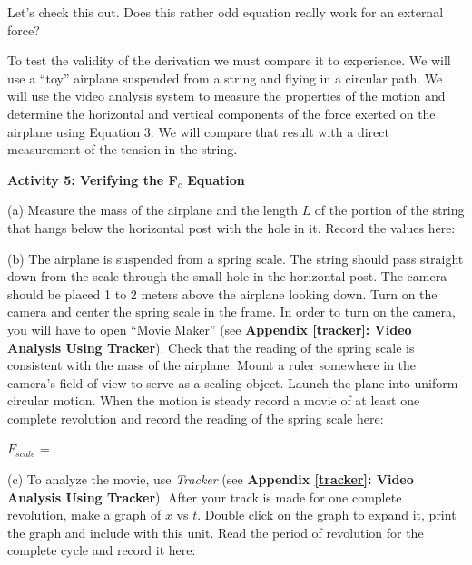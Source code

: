 Let's check this out. Does this rather odd equation really work for an external
force?

To test the validity of the derivation we must compare it to experience. We
will use a ``toy'' airplane suspended from a string and flying
in a circular path. We will use the video analysis system to measure the properties
of the motion and determine the horizontal and vertical components of the force
exerted on the airplane using Equation 3. We will compare that result with a
direct measurement of the tension in the string. 

\textbf{Activity 5: Verifying the F\( _{c} \) Equation }

(a) Measure the mass of the airplane and the length $L$ of the portion of the
string that hangs below the horizontal post with the hole in it. Record the
values here: 
\vspace{10mm}

(b) The airplane is suspended from a spring scale. The string should pass straight
down from the scale through the small hole in the horizontal post. The camera
should be placed 1 to 2 meters above the airplane looking down. Turn on the camera and center
the spring scale in the frame. In order to turn on the camera, you will have to open ``Movie Maker'' (see \textbf{Appendix \ref{tracker}: Video Analysis Using Tracker}). Check that the reading of the spring
scale is consistent with the mass of the airplane. Mount a ruler somewhere in the
camera's field of view to serve as a scaling object. Launch the plane into uniform
circular motion. When the motion is steady record a movie of at least one complete
revolution and record the reading of the spring scale here:
\vspace{5mm}

\hspace{0.5in} \( F_{scale} \) = 
\vspace{5mm}

%
%
(c) To analyze the movie, use \textit{Tracker} (see \textbf{Appendix \ref{tracker}: Video Analysis Using Tracker}). After your track is made for one complete revolution, make a graph of $x$ vs $t$. Double click on the graph to expand it, print the graph and include with this unit. Read the period of revolution for the complete cycle and record it here:
\vspace{5mm}


